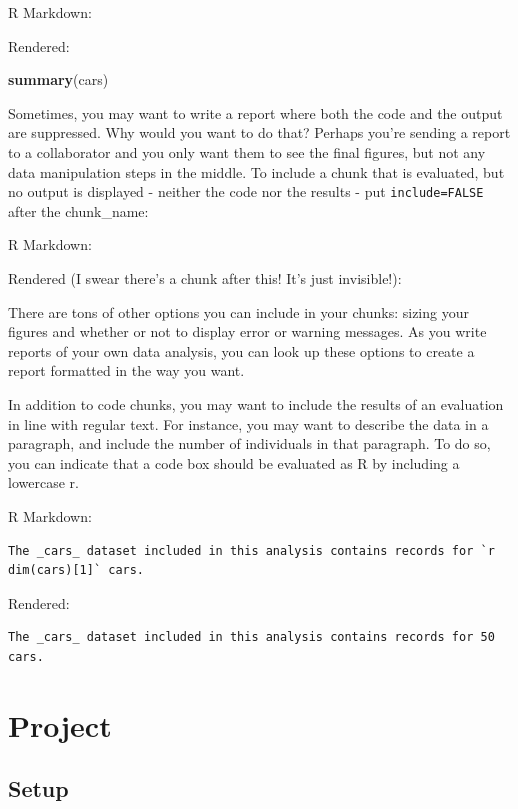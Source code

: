 \documentclass[
]{book}
\newenvironment{Shaded}{\begin{snugshade}}{\end{snugshade}}
\newcommand{\KeywordTok}[1]{\textcolor[rgb]{0.13,0.29,0.53}{\textbf{#1}}}
\newcommand{\NormalTok}[1]{#1}
\begin{document}
R Markdown:

Rendered:

\begin{Shaded}
\begin{Highlighting}[]
\KeywordTok{summary}\NormalTok{(cars)}
\end{Highlighting}
\end{Shaded}

Sometimes, you may want to write a report where both the code and the output are suppressed. Why would you want to do that? Perhaps you're sending a report to a collaborator and you only want them to see the final figures, but not any data manipulation steps in the middle. To include a chunk that is evaluated, but no output is displayed - neither the code nor the results - put \texttt{include=FALSE} after the chunk\_name:

R Markdown:

Rendered (I swear there's a chunk after this! It's just invisible!):

There are tons of other options you can include in your chunks: sizing your figures and whether or not to display error or warning messages. As you write reports of your own data analysis, you can look up these options to create a report formatted in the way you want.

In addition to code chunks, you may want to include the results of an evaluation in line with regular text. For instance, you may want to describe the data in a paragraph, and include the number of individuals in that paragraph. To do so, you can indicate that a code box should be evaluated as R by including a lowercase r.

R Markdown:

\begin{verbatim}
The _cars_ dataset included in this analysis contains records for `r dim(cars)[1]` cars. 
\end{verbatim}

Rendered:

\begin{verbatim}
The _cars_ dataset included in this analysis contains records for 50 cars.
\end{verbatim}

\hypertarget{project}{%
\chapter{Project}\label{project}}

\hypertarget{setup-1}{%
\section{Setup}\label{setup-1}}
\end{document}
